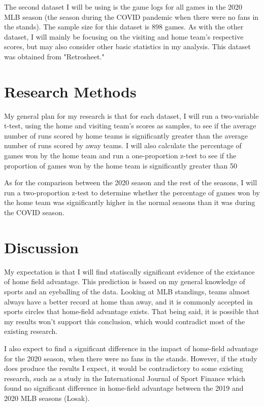 \documentclass[12pt]{article}
\begin{document}
The second dataset I will be using is the game logs for all games in the 2020 MLB season (the season during the COVID pandemic when there were no fans in the stands). The sample size for this dataset is 898 games. As with the other dataset, I will mainly be focusing on the visiting and home team's respective scores, but may also consider other basic statistics in my analysis. This dataset was obtained from "Retrosheet."

\section{Research Methods}
My general plan for my research is that for each dataset, I will run a two-variable t-test, using the home and visiting team's scores as samples, to see if the average number of runs scored by home teams is significantly greater than the average number of runs scored by away teams. I will also calculate the percentage of games won by the home team and run a one-proportion z-test to see if the proportion of games won by the home team is significantly greater than 50%

As for the comparison between the 2020 season and the rest of the seasons, I will run a two-proportion z-test to determine whether the percentage of games won by the home team was significantly higher in the normal seasons than it was during the COVID season.

\section{Discussion}
My expectation is that I will find statiscally significant evidence of the existance of home field advantage. This prediction is based on my general knowledge of sports and an eyeballing of the data. Looking at MLB standings, teams almost always have a better record at home than away, and it is commonly accepted in sports circles that home-field advantage exists. That being said, it is possible that my results won't support this conclusion, which would contradict most of the existing research.

I also expect to find a significant difference in the impact of home-field advantage for the 2020 season, when there were no fans in the stands. However, if the study does produce the results I expect, it would be contradictory to some existing research, such as a study in the International Journal of Sport Finance which found no significant difference in home-field advantage between the 2019 and 2020 MLB seasons (Losak).
\end{document}
